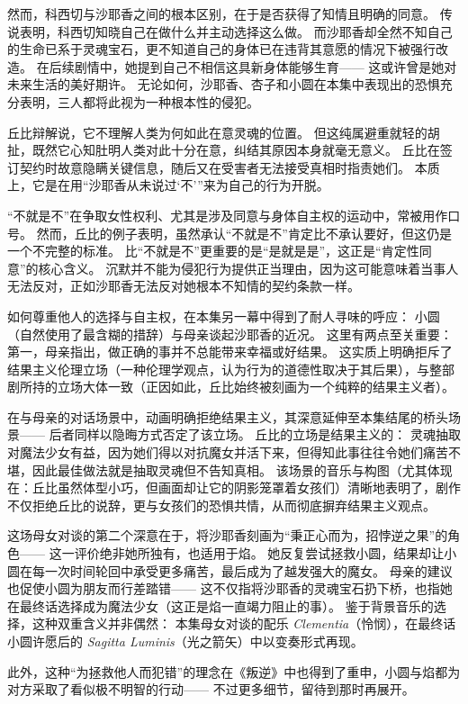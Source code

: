 然而，科西切与沙耶香之间的根本区别，在于是否获得了知情且明确的同意。
传说表明，科西切知晓自己在做什么并主动选择这么做。
而沙耶香却全然不知自己的生命已系于灵魂宝石，更不知道自己的身体已在违背其意愿的情况下被强行改造。
在后续剧情中，她提到自己不相信这具新身体能够生育——
这或许曾是她对未来生活的美好期许。
无论如何，沙耶香、杏子和小圆在本集中表现出的恐惧充分表明，三人都将此视为一种根本性的侵犯。

丘比辩解说，它不理解人类为何如此在意灵魂的位置。
但这纯属避重就轻的胡扯，既然它心知肚明人类对此十分在意，纠结其原因本身就毫无意义。
丘比在签订契约时故意隐瞒关键信息，随后又在受害者无法接受真相时指责她们。
本质上，它是在用“沙耶香从未说过‘不’”来为自己的行为开脱。

“不就是不”在争取女性权利、尤其是涉及同意与身体自主权的运动中，常被用作口号。
然而，丘比的例子表明，虽然承认“不就是不”肯定比不承认要好，但这仍是一个不完整的标准。
比“不就是不”更重要的是“是就是是”，这正是“肯定性同意”的核心含义\cite{ref37}。
沉默并不能为侵犯行为提供正当理由，因为这可能意味着当事人无法反对，正如沙耶香无法反对她根本不知情的契约条款一样。

如何尊重他人的选择与自主权，在本集另一幕中得到了耐人寻味的呼应：
小圆（自然使用了最含糊的措辞）与母亲谈起沙耶香的近况。
这里有两点至关重要：
第一，母亲指出，做正确的事并不总能带来幸福或好结果。
这实质上明确拒斥了结果主义伦理立场（一种伦理学观点，认为行为的道德性取决于其后果\cite{ref38}），与整部剧所持的立场大体一致（正因如此，丘比始终被刻画为一个纯粹的结果主义者）。

在与母亲的对话场景中，动画明确拒绝结果主义，其深意延伸至本集结尾的桥头场景——
后者同样以隐晦方式否定了该立场。
丘比的立场是结果主义的：
灵魂抽取对魔法少女有益，因为她们得以对抗魔女并活下来，但得知此事往往令她们痛苦不堪，因此最佳做法就是抽取灵魂但不告知真相。
该场景的音乐与构图（尤其体现在：丘比虽然体型小巧，但画面却让它的阴影笼罩着女孩们）清晰地表明了，剧作不仅拒绝丘比的说辞，更与女孩们的恐惧共情，从而彻底摒弃结果主义观点。

这场母女对谈的第二个深意在于，将沙耶香刻画为“秉正心而为，招悖逆之果”的角色——
这一评价绝非她所独有，也适用于焰。
她反复尝试拯救小圆，结果却让小圆在每一次时间轮回中承受更多痛苦，最后成为了越发强大的魔女。
母亲的建议也促使小圆为朋友而行差踏错——
这不仅指将沙耶香的灵魂宝石扔下桥，也指她在最终话选择成为魔法少女（这正是焰一直竭力阻止的事）。
鉴于背景音乐的选择，这种双重含义并非偶然：
本集母女对谈的配乐 \emph{Clementia}（怜悯），在最终话小圆许愿后的 \emph{Sagitta Luminis}（光之箭矢）中以变奏形式再现。

此外，这种“为拯救他人而犯错”的理念在《叛逆》中也得到了重申，小圆与焰都为对方采取了看似极不明智的行动——
不过更多细节，留待到那时再展开。
